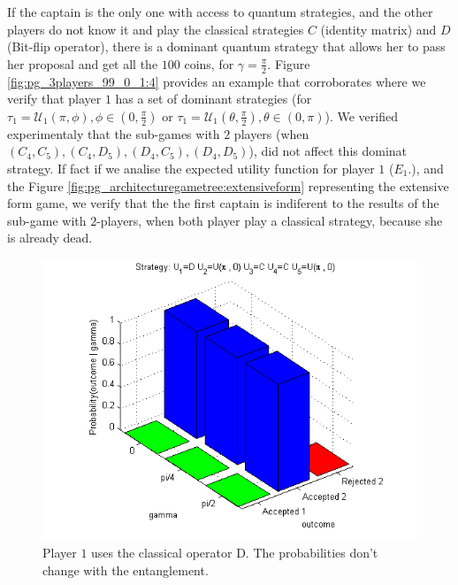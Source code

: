 If the captain is the only one with access to quantum strategies, and the other players do not know it and play the classical strategies $C$ (identity matrix) and $D$ (Bit-flip operator), there is a dominant quantum strategy that allows her to pass her proposal and get all the $100$ coins, for $\gamma = \frac{\pi}{2}$. Figure \ref{fig:pg_3players_99_0_1:4} provides an example that corroborates where we verify that player $1$ has a set of dominant strategies (for $\tau_{1} = \mathcal{U}_{1}(\pi,\phi), \phi \in (0, \frac{\pi}{2})$ or $\tau_{1} = \mathcal{U}_{1}(\theta,\frac{\pi}{2}), \theta \in (0, \pi)$). We verified experimentaly that the sub-games with $2$ players (when $(C_{4},C_{5}), (C_{4},D_{5}), (D_{4},C_{5}), (D_{4},D_{5})$), did not affect this dominat strategy. If fact if we analise the expected utility function for player $1$ ($E_{1}.$), and the Figure \ref{fig:pg_architecturegametree:extensiveform} representing the extensive form game, we verify that the the first captain is indiferent to the results of the sub-game with $2$-players, when both player play a classical strategy, because she is already dead. 

\begin{figure}[h]
\centering 
\includegraphics[scale=0.80]{Figures/1.5qubit/DUpi0CCUpi0.png}
\caption{Player $1$ uses the classical operator D. The probabilities don't change with the entanglement.  }
\label{fig:pg_3players_99_0_1:2}
\end{figure}

